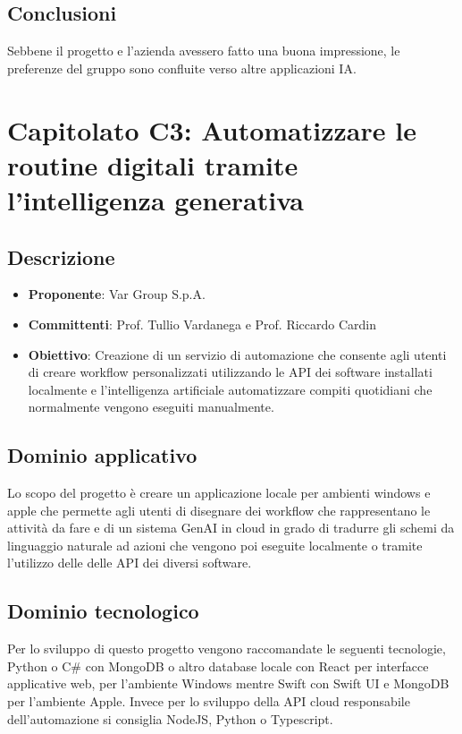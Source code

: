 \documentclass[italian, 12pt]{article}
\begin{document}
\subsection{Conclusioni}
Sebbene il progetto e l’azienda avessero fatto una buona impressione, le preferenze del gruppo sono confluite verso altre applicazioni IA.

\section{Capitolato C3: Automatizzare le routine digitali tramite l’intelligenza generativa}
\subsection{Descrizione}
\begin{itemize}
\item\textbf{Proponente}: Var Group S.p.A.
\item\textbf{Committenti}: Prof. Tullio Vardanega e Prof. Riccardo Cardin
\item\textbf{Obiettivo}: Creazione di un servizio di automazione che consente agli utenti di creare workflow personalizzati utilizzando le API dei software installati localmente e l'intelligenza artificiale automatizzare compiti quotidiani che normalmente vengono eseguiti manualmente.
\end{itemize}

\subsection{Dominio applicativo}
Lo scopo del progetto è creare un applicazione locale per ambienti windows e apple che permette agli utenti di disegnare dei workflow che rappresentano le attività da fare e di un sistema GenAI in cloud in grado di tradurre gli schemi da linguaggio naturale ad azioni che vengono poi eseguite localmente o tramite l'utilizzo delle delle API dei diversi software.

\subsection{Dominio tecnologico}
Per lo sviluppo di questo progetto vengono raccomandate le seguenti tecnologie, Python o C\# con MongoDB o altro database locale con React per interfacce applicative web, per l'ambiente Windows mentre Swift con Swift UI e MongoDB per l'ambiente Apple. Invece per lo sviluppo della API cloud responsabile dell'automazione si consiglia NodeJS, Python o Typescript.
\end{document}
